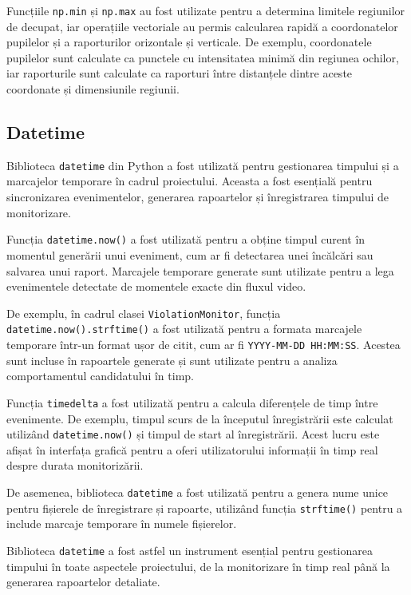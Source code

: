 \documentclass[12pt,a4paper]{article}
\begin{document}
Funcțiile \texttt{np.min} și \texttt{np.max} au fost utilizate pentru a determina limitele regiunilor de decupat, iar operațiile vectoriale au permis calcularea rapidă a coordonatelor pupilelor și a raporturilor orizontale și verticale. De exemplu, coordonatele pupilelor sunt calculate ca punctele cu intensitatea minimă din regiunea ochilor, iar raporturile sunt calculate ca raporturi între distanțele dintre aceste coordonate și dimensiunile regiunii.

\subsection{Datetime}
Biblioteca \texttt{datetime}\cite{datetime} din Python a fost utilizată pentru gestionarea timpului și a marcajelor temporare în cadrul proiectului. Aceasta a fost esențială pentru sincronizarea evenimentelor, generarea rapoartelor și înregistrarea timpului de monitorizare.

Funcția \texttt{datetime.now()} a fost utilizată pentru a obține timpul curent în momentul generării unui eveniment, cum ar fi detectarea unei încălcări sau salvarea unui raport. Marcajele temporare generate sunt utilizate pentru a lega evenimentele detectate de momentele exacte din fluxul video.

De exemplu, în cadrul clasei \texttt{ViolationMonitor}, funcția \texttt{datetime.now().strftime()} a fost utilizată pentru a formata marcajele temporare într-un format ușor de citit, cum ar fi \texttt{YYYY-MM-DD HH:MM:SS}. Acestea sunt incluse în rapoartele generate și sunt utilizate pentru a analiza comportamentul candidatului în timp.

Funcția \texttt{timedelta} a fost utilizată pentru a calcula diferențele de timp între evenimente. De exemplu, timpul scurs de la începutul înregistrării este calculat utilizând \texttt{datetime.now()} și timpul de start al înregistrării. Acest lucru este afișat în interfața grafică pentru a oferi utilizatorului informații în timp real despre durata monitorizării.

De asemenea, biblioteca \texttt{datetime} a fost utilizată pentru a genera nume unice pentru fișierele de înregistrare și rapoarte, utilizând funcția \texttt{strftime()} pentru a include marcaje temporare în numele fișierelor.

Biblioteca \texttt{datetime} a fost astfel un instrument esențial pentru gestionarea timpului în toate aspectele proiectului, de la monitorizare în timp real până la generarea rapoartelor detaliate.
\end{document}
